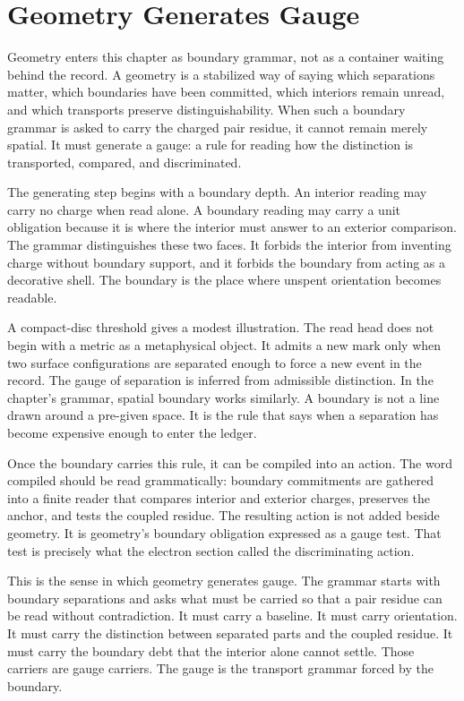 \section{Geometry Generates Gauge}

Geometry enters this chapter as boundary grammar, not as a container waiting
behind the record. A geometry is a stabilized way of saying which separations
matter, which boundaries have been committed, which interiors remain
unread, and which transports preserve distinguishability. When such a
boundary grammar is asked to carry the charged pair residue, it cannot remain
merely spatial. It must generate a gauge: a rule for reading how the
distinction is transported, compared, and discriminated.

The generating step begins with a boundary depth. An interior reading may
carry no charge when read alone. A boundary reading may carry a unit
obligation because it is where the interior must answer to an exterior
comparison. The grammar distinguishes these two faces. It forbids the
interior from inventing charge without boundary support, and it forbids the
boundary from acting as a decorative shell. The boundary is the place where
unspent orientation becomes readable.

A compact-disc threshold gives a modest illustration. The read head does not
begin with a metric as a metaphysical object. It admits a new mark only when
two surface configurations are separated enough to force a new event in the
record. The gauge of separation is inferred from admissible distinction. In
the chapter's grammar, spatial boundary works similarly. A boundary is not a
line drawn around a pre-given space. It is the rule that says when a
separation has become expensive enough to enter the ledger.

Once the boundary carries this rule, it can be compiled into an action. The
word compiled should be read grammatically: boundary commitments are gathered
into a finite reader that compares interior and exterior charges, preserves
the anchor, and tests the coupled residue. The resulting action is not added
beside geometry. It is geometry's boundary obligation expressed as a gauge
test. That test is precisely what the electron section called the
discriminating action.

This is the sense in which geometry generates gauge. The grammar starts with
boundary separations and asks what must be carried so that a pair residue can
be read without contradiction. It must carry a baseline. It must carry
orientation. It must carry the distinction between separated parts and the
coupled residue. It must carry the boundary debt that the interior alone
cannot settle. Those carriers are gauge carriers. The gauge is the transport
grammar forced by the boundary.

